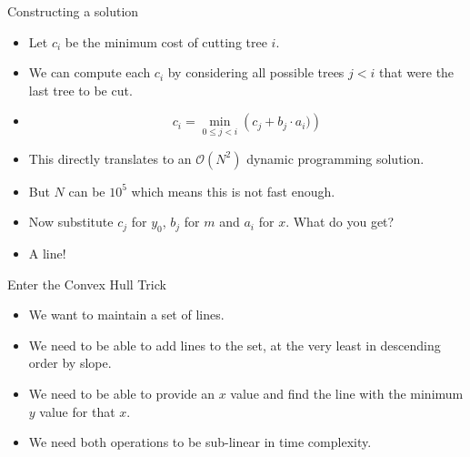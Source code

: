 \documentclass{beamer}
\begin{document}
\begin{frame}[plain]{Constructing a solution}
    \begin{itemize}
        \item<1-> Let $c_i$ be the minimum cost of cutting tree $i$.
        \item<2-> We can compute each $c_i$ by considering all possible trees $j < i$ that were the last tree to be cut.
        \item<3-> \[ c_i = \min_{0 \le j < i}\left( c_j + b_j \cdot a_i ) \right) \]
        \item<4-> This directly translates to an $\mathcal{O}\left(N^{2}\right)$ dynamic programming solution.
        \item<5-> But $N$ can be $10^5$ which means this is not fast enough.
        \item<6-> Now substitute $c_j$ for $y_0$, $b_j$ for $m$ and $a_i$ for $x$. What do you get?
        \item<7-> A line!
    \end{itemize}
\end{frame}

\begin{frame}[plain]{Enter the Convex Hull Trick}
    \begin{itemize}
        \item<1-> We want to maintain a set of lines.
        \item<2-> We need to be able to add lines to the set, at the very least in descending order by slope.
        \item<3-> We need to be able to provide an $x$ value and find the line with the minimum $y$ value for that $x$.
        \item<4-> We need both operations to be sub-linear in time complexity.
    \end{itemize}
\end{frame}
\end{document}
